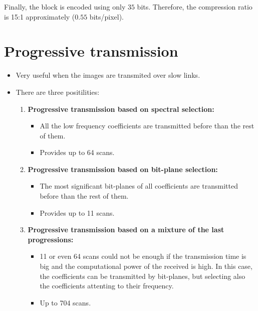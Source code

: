 Finally, the block is encoded using only $35$ bits. Therefore, the
compression ratio is 15:1 approximately ($0.55$ bits/pixel).

\section{Progressive transmission}
\begin{itemize}
\item Very useful when the images are transmited over slow links.
\item There are three positilities:
  \begin{enumerate}
  \item \textbf{Progressive transmission based on spectral selection:}
    \begin{itemize}
    \item All the low frequency coefficients are transmitted before
      than the rest of them.
    \item Provides up to 64 scans.
    \end{itemize}
  \item \textbf{Progressive transmission based on bit-plane selection:}
    \begin{itemize}
    \item The most significant bit-planes of all coefficients are
      transmitted before than the rest of them.
    \item Provides up to 11 scans.
    \end{itemize}
  \item \textbf{Progressive transmission based on a mixture of the
    last progressions:}
    \begin{itemize}
    \item 11 or even 64 scans could not be enough if the transmission
      time is big and the computational power of the received is
      high. In this case, the coefficients can be transmitted by
      bit-planes, but selecting also the coefficients attenting to
      their frequency.
    \item Up to 704 scans.
    \end{itemize}
  \end{enumerate}
\end{itemize}

